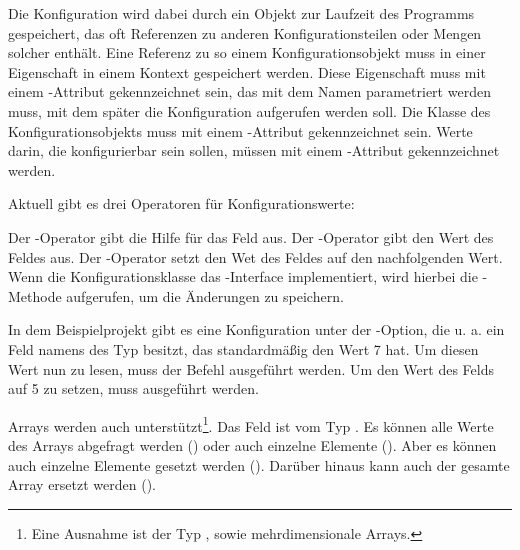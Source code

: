 Die Konfiguration wird dabei durch ein Objekt zur Laufzeit des Programms gespeichert, das oft Referenzen zu anderen Konfigurationsteilen oder Mengen solcher enthält.
Eine Referenz zu so einem Konfigurationsobjekt muss in einer Eigenschaft in einem Kontext gespeichert werden.
Diese Eigenschaft muss mit einem -Attribut gekennzeichnet sein, das mit dem Namen parametriert werden muss,
mit dem später die Konfiguration aufgerufen werden soll.
Die Klasse des Konfigurationsobjekts muss mit einem -Attribut gekennzeichnet sein.
Werte darin, die konfigurierbar sein sollen, müssen mit einem -Attribut gekennzeichnet werden.

Aktuell gibt es drei Operatoren für Konfigurationswerte:
\begin{outline}
 \1 Der -Operator gibt die Hilfe für das Feld aus.
 \1 Der -Operator gibt den Wert des Feldes aus.
 \1 Der -Operator setzt den Wet des Feldes auf den nachfolgenden Wert.
 Wenn die Konfigurationsklasse das -Interface implementiert, 
 wird hierbei die -Methode aufgerufen, um die \"Anderungen zu speichern.
 \end{outline}

In dem Beispielprojekt gibt es eine Konfiguration unter der -Option, die u. a. ein Feld namens  des Typ  besitzt,
das standardmäßig den Wert 7 hat.
Um diesen Wert nun zu lesen, muss der Befehl  ausgeführt werden.
Um den Wert des Felds auf 5 zu setzen, muss  ausgeführt werden.

Arrays werden auch unterstützt\footnote{Eine Ausnahme ist der Typ , sowie mehrdimensionale Arrays.}.
Das Feld  ist vom Typ .
Es können alle Werte des Arrays abgefragt werden ()
oder auch einzelne Elemente ().
Aber es können auch einzelne Elemente gesetzt werden ().
Darüber hinaus kann auch der gesamte Array ersetzt werden ().

